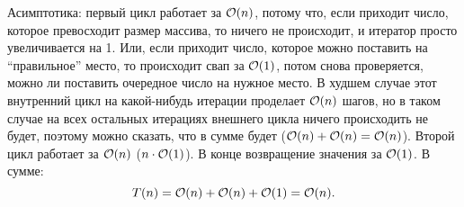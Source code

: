 \begin{enumerate}
\begin{solution}
      Асимптотика: первый цикл работает за $\mathcal{O}(n)$, потому что, если приходит число, которое превосходит размер массива, то ничего не происходит, и итератор просто увеличивается на 1. Или, если приходит число, которое можно поставить на ``правильное'' место, то происходит свап за $\mathcal{O}(1)$, потом снова проверяется, можно ли поставить очередное число на нужное место. В худшем случае этот внутренний цикл на какой-нибудь итерации проделает $\mathcal{O}(n)$ шагов, но в таком случае на всех остальных итерациях внешнего цикла ничего происходить не будет, поэтому можно сказать, что в сумме будет ($\mathcal{O}(n)+\mathcal{O}(n)=\mathcal{O}(n)$). Второй цикл работает за $\mathcal{O}(n)$ ($n \cdot \mathcal{O}(1)$). В конце возвращение значения за $\mathcal{O}(1)$. В сумме:
      \begin{equation}
        T(n) = \mathcal{O}(n) + \mathcal{O}(n) + \mathcal{O}(1) = \mathcal{O}(n).
      \end{equation}
    \end{solution}


\end{enumerate}
